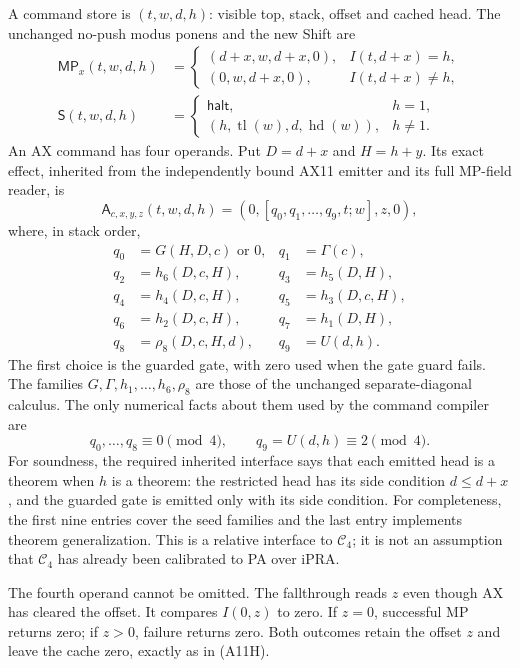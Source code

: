 A command store is $(t,w,d,h)$: visible top, stack, offset and cached head.
The unchanged no-push modus ponens and the new Shift are
\begin{align*}
 \mathsf{MP}_x(t,w,d,h)&=
 \begin{cases}(d+x,w,d+x,0),&I(t,d+x)=h,\\
 (0,w,d+x,0),&I(t,d+x)\ne h,
 \end{cases}\\
 \mathsf S(t,w,d,h)&=
 \begin{cases}\mathsf{halt},&h=1,\\
 (h,\operatorname{tl}(w),d,\operatorname{hd}(w)),&h\ne1.
 \end{cases}
\end{align*}
An AX command has four operands.  Put $D=d+x$ and $H=h+y$.  Its exact
effect, inherited from the independently bound AX11 emitter and its full
MP-field reader, is
\[
 \mathsf A_{c,x,y,z}(t,w,d,h)
   =(0,[q_0,q_1,\ldots,q_9,t;w],z,0),                 \tag{A11H}
\]
where, in stack order,
\begin{align*}
 q_0&=G(H,D,c)\text{ or }0, & q_1&=\Gamma(c),\\
 q_2&=h_6(D,c,H),           & q_3&=h_5(D,H),\\
 q_4&=h_4(D,c,H),           & q_5&=h_3(D,c,H),\\
 q_6&=h_2(D,c,H),           & q_7&=h_1(D,H),\\
 q_8&=\rho_8(D,c,H,d),      & q_9&=U(d,h).
\end{align*}
The first choice is the guarded gate, with zero used when the gate guard
fails.  The families $G,\Gamma,h_1,\ldots,h_6,\rho_8$ are those of the
unchanged separate-diagonal calculus.  The only numerical facts about
them used by the command compiler are
\[
 q_0,\ldots,q_8\equiv0\pmod4,
 \qquad q_9=U(d,h)\equiv2\pmod4.
\]
For soundness, the required inherited interface says that each emitted
head is a theorem when $h$ is a theorem: the restricted head has its
side condition $d\leq d+x$, and the guarded gate is emitted only with
its side condition.  For completeness, the first nine entries cover
the seed families and the last entry implements theorem generalization.
This is a relative interface to $\mathcal C_4$; it is not an assumption
that $\mathcal C_4$ has already been calibrated to PA over iPRA.

The fourth operand cannot be omitted.  The fallthrough reads $z$ even
though AX has cleared the offset.  It compares $I(0,z)$ to zero.  If
$z=0$, successful MP returns zero; if $z>0$, failure returns zero.
Both outcomes retain the offset $z$ and leave the cache zero, exactly
as in (A11H).

